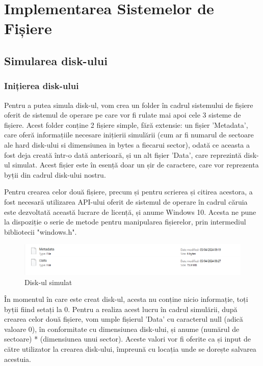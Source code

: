 \chapter{Implementarea Sistemelor de Fișiere}

\section{Simularea disk-ului}

\subsection{Inițierea disk-ului}

Pentru a putea simula disk-ul, vom crea un folder în cadrul sistemului de fișiere oferit de sistemul de operare pe care vor fi rulate mai apoi cele 3 sisteme de fișiere. Acest folder conține 2 fișiere simple, fără extensie: un fișier 'Metadata', care oferă informațiile necesare inițierii simulării (cum ar fi numarul de sectoare ale hard disk-ului si dimensiunea in bytes a fiecarui sector), odată ce aceasta a fost deja creată într-o dată anterioară, și un alt fișier 'Data', care reprezintă disk-ul simulat. Acest fișier este în esență doar un șir de caractere, care vor reprezenta byții din cadrul disk-ului nostru.

Pentru crearea celor două fișiere, precum și pentru scrierea și citirea acestora, a fost necesară utilizarea API-ului oferit de sistemul de operare în cadrul căruia este dezvoltată această lucrare de licență, și anume Windows 10. Acesta ne pune la dispoziție o serie de metode pentru manipularea fișierelor, prin intermediul bibliotecii "windows.h".

\bigskip

\begin{figure}[h]
    \centering
    \includegraphics[width=1.0\linewidth]{images/2.1.png}
    \caption{Disk-ul simulat}
    \label{fig:enter-label}
\end{figure}

În momentul în care este creat disk-ul, acesta nu conține nicio informație, toți byții fiind setați la 0. Pentru a realiza acest lucru în cadrul simulării, după crearea celor două fișiere, vom umple fișierul 'Data' cu caracterul null (adică valoare 0), în conformitate cu dimensiunea disk-ului, și anume (numărul de sectoare) * (dimensiunea unui sector). Aceste valori vor fi oferite ca și input de către utilizator la crearea disk-ului, împreună cu locația unde se dorește salvarea acestuia.


